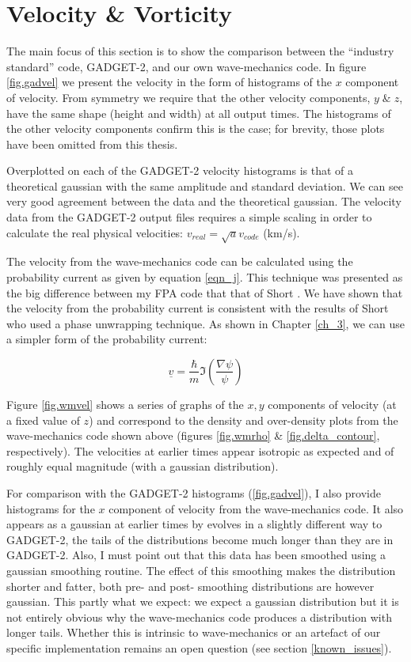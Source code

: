 \section{Velocity \& Vorticity}
The main focus of this section is to show the comparison between  the ``industry standard'' code, GADGET-2, and our own wave-mechanics code. In figure \ref{fig.gadvel} we present the velocity in the form of histograms of the $x$ component of velocity. From symmetry we require that the other velocity components, $y \; \& \; z$, have the same shape (height and width) at all output times. The histograms of the other velocity components confirm this is the case; for brevity, those plots have been omitted from this thesis.

Overplotted on each of the GADGET-2 velocity histograms is that of a theoretical gaussian with the same amplitude and standard deviation. We can see very good agreement between the data and the theoretical gaussian. The velocity data from the GADGET-2 output files requires a simple scaling in order to calculate the real physical velocities: $v_{real} = \sqrt{a} v_{code}$ (km/s).

The velocity from the wave-mechanics code can be calculated using the probability current as given by equation \ref{eqn_j}. This technique was presented as the big difference between my FPA code that that of Short \citep{bib_short}. We have shown that the velocity from the probability current is consistent with the results of Short who used a phase unwrapping technique. As shown in Chapter \ref{ch_3}, we can use a simpler form of the probability current:

\begin{equation}
\underline{v} = \frac{\hbar}{m} \Im\left(\frac{\nabla \psi}{\psi}\right)
\end{equation}

Figure \ref{fig.wmvel} shows a series of graphs of the $x,y$ components of velocity (at a fixed value of $z$) and correspond to the density and over-density plots from the wave-mechanics code shown above (figures \ref{fig.wmrho} \& \ref{fig.delta_contour}, respectively). The velocities at earlier times appear isotropic as expected and of roughly equal magnitude (with a gaussian distribution).

For comparison with the GADGET-2 histograms (\ref{fig.gadvel}), I also provide histograms for the $x$ component of velocity from the wave-mechanics code. It also appears as a gaussian at earlier times by evolves in a slightly different way to GADGET-2, the tails of the distributions become much longer than they are in GADGET-2. Also, I must point out that this data has been smoothed using a gaussian smoothing routine. The effect of this smoothing makes the distribution shorter and fatter, both pre- and post- smoothing distributions are however gaussian. This partly what we expect: we expect a gaussian distribution but it is not entirely obvious why the wave-mechanics code produces a distribution with longer tails. Whether this is intrinsic to wave-mechanics or an artefact of our specific implementation remains an open question (see section \ref{known_issues}).

